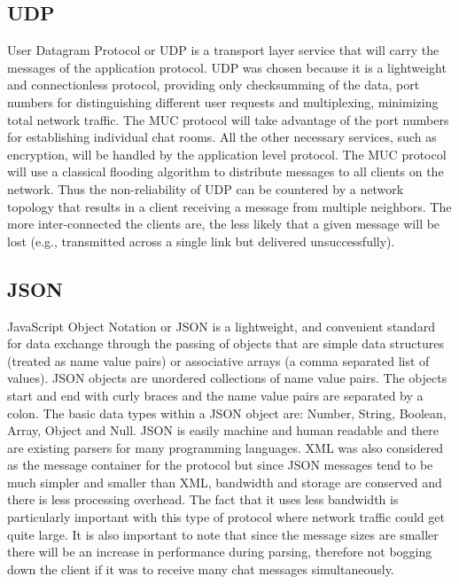 \documentclass{article}
\begin{document}
\subsection{UDP}

User Datagram Protocol or UDP is a transport layer service that will carry the
messages of the application protocol.   UDP was chosen because it is a
lightweight and connectionless protocol, providing only checksumming of the
data, port numbers for distinguishing different user requests and multiplexing,
minimizing total network traffic. The MUC protocol will take advantage of the
port numbers for establishing individual chat rooms.  All the other necessary
services, such as encryption, will be handled by the application level protocol.
The MUC protocol will use a classical flooding algorithm to distribute messages
to all clients on the network. Thus the non-reliability of UDP can be countered
by a network topology that results in a client receiving a message from multiple
neighbors. The more inter-connected the clients are, the less likely that a
given message will be lost (e.g., transmitted across a single link but delivered
unsuccessfully).

\subsection{JSON}

JavaScript Object Notation or JSON is a lightweight, and convenient standard for
data exchange through the passing of objects that are simple data structures
(treated as name value pairs) or associative arrays (a comma separated list of
values).  JSON objects are unordered collections of name value pairs.  The
objects start and end with curly braces and the name value pairs are separated
by a colon.  The basic data types within a JSON object are: Number, String,
Boolean, Array, Object and Null.  JSON is easily machine and human readable and
there are existing parsers for many programming languages. XML was also
considered as the message container for the protocol but since JSON messages
tend to be much simpler and smaller than XML, bandwidth and storage are
conserved and there is less processing overhead.  The fact that it uses less
bandwidth is particularly important with this type of protocol where network
traffic could get quite large. It is also important to note that since the
message sizes are smaller there will be an increase in performance during
parsing, therefore not bogging down the client if it was to receive many chat
messages simultaneously.
\end{document}
